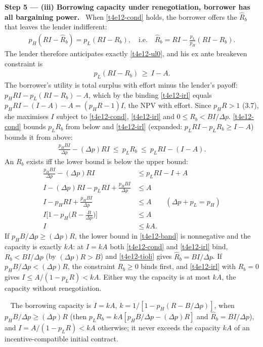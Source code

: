 \documentclass[11pt,a4paper]{article}
\newcommand{\step}[2]{\par\medskip\noindent\textbf{Step #1 --- #2.}~}
\newcommand{\answer}[1]{\par\smallskip\noindent\fbox{\textbf{Answer #1.}}~}
\begin{document}
\step{5}{(iii) Borrowing capacity under renegotiation, borrower has all bargaining power} When
\eqref{t4e12-cond} holds, the borrower offers the $\hat R_b$ that leaves the lender indifferent:
\begin{align}
  p_H(RI-\hat R_b) = p_L(RI-R_b), \quad\text{i.e.}\quad \hat R_b=RI-\frac{p_L}{p_H}(RI-R_b). \label{t4e12-tioli}
\end{align}
The lender therefore anticipates exactly \eqref{t4e12-ul0}, and his ex ante breakeven constraint is
\begin{align}
  p_L(RI-R_b) \ \ge\ I-A. \label{t4e12-irl}
\end{align}
The borrower's utility is total surplus with effort minus the lender's payoff:
$p_HRI-p_L(RI-R_b)-A$, which by the binding \eqref{t4e12-irl} equals $p_HRI-(I-A)-A=(p_HR-1)I$, the
NPV with effort. Since $p_HR>1$ (3.7), she maximises $I$ subject to
\eqref{t4e12-cond}, \eqref{t4e12-irl} and $0\le R_b<BI/\Delta p$. \eqref{t4e12-cond} bounds $p_LR_b$
from below and \eqref{t4e12-irl} (expanded: $p_LRI-p_LR_b\ge I-A$) bounds it from above:
\begin{align}
  \frac{p_HBI}{\Delta p}-(\Delta p)RI\ \le\ p_LR_b\ \le\ p_LRI-(I-A). \label{t4e12-band}
\end{align}
An $R_b$ exists iff the lower bound is below the upper bound:
\begin{align}
  \frac{p_HBI}{\Delta p}-(\Delta p)RI &\le p_LRI-I+A \nonumber\\
  I-(\Delta p)RI-p_LRI+\frac{p_HBI}{\Delta p} &\le A \nonumber\\
  I-p_HRI+\frac{p_HBI}{\Delta p} &\le A \qquad (\Delta p+p_L=p_H) \nonumber\\
  I\Big[1-p_H\Big(R-\frac{B}{\Delta p}\Big)\Big] &\le A \nonumber\\
  I &\le kA. \label{t4e12-kA}
\end{align}
If $p_HB/\Delta p\ge(\Delta p)R$, the lower bound in \eqref{t4e12-band} is nonnegative and the capacity
is exactly $kA$: at $I=kA$ both \eqref{t4e12-cond} and \eqref{t4e12-irl} bind, $R_b<BI/\Delta p$ (by
$(\Delta p)R>B$) and \eqref{t4e12-tioli} gives $\hat R_b=BI/\Delta p$. If $p_HB/\Delta p<(\Delta p)R$, the
constraint $R_b\ge0$ binds first, and \eqref{t4e12-irl} with $R_b=0$ gives $I\le A/(1-p_LR)<kA$.
Either way the capacity is at most $kA$, the capacity without renegotiation.

\answer{(iii)} The borrowing capacity is $I=kA$, $k=1/[1-p_H(R-B/\Delta p)]$, when
$p_HB/\Delta p\ge(\Delta p)R$ (then $p_LR_b=kA[p_HB/\Delta p-(\Delta p)R]$ and $\hat R_b=BI/\Delta p$),
and $I=A/(1-p_LR)<kA$ otherwise; it never exceeds the capacity $kA$ of an incentive-compatible
initial contract.
\end{document}
